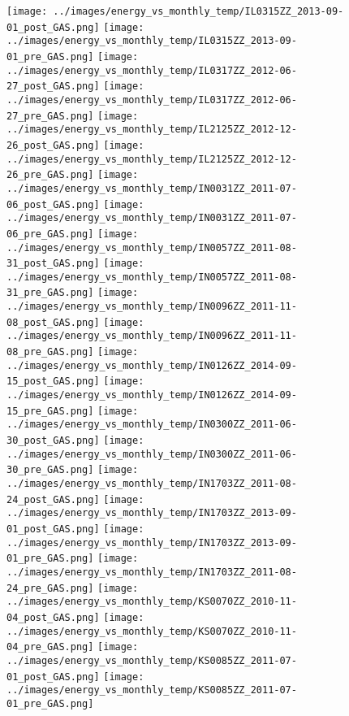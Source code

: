 \clearpage
\begin{figure}
\centering
\texttt{[image: ../images/energy\_vs\_monthly\_temp/IL0315ZZ\_2013-09-01\_post\_GAS.png]}
\texttt{[image: ../images/energy\_vs\_monthly\_temp/IL0315ZZ\_2013-09-01\_pre\_GAS.png]}
\texttt{[image: ../images/energy\_vs\_monthly\_temp/IL0317ZZ\_2012-06-27\_post\_GAS.png]}
\texttt{[image: ../images/energy\_vs\_monthly\_temp/IL0317ZZ\_2012-06-27\_pre\_GAS.png]}
\texttt{[image: ../images/energy\_vs\_monthly\_temp/IL2125ZZ\_2012-12-26\_post\_GAS.png]}
\texttt{[image: ../images/energy\_vs\_monthly\_temp/IL2125ZZ\_2012-12-26\_pre\_GAS.png]}
\texttt{[image: ../images/energy\_vs\_monthly\_temp/IN0031ZZ\_2011-07-06\_post\_GAS.png]}
\texttt{[image: ../images/energy\_vs\_monthly\_temp/IN0031ZZ\_2011-07-06\_pre\_GAS.png]}
\texttt{[image: ../images/energy\_vs\_monthly\_temp/IN0057ZZ\_2011-08-31\_post\_GAS.png]}
\texttt{[image: ../images/energy\_vs\_monthly\_temp/IN0057ZZ\_2011-08-31\_pre\_GAS.png]}
\texttt{[image: ../images/energy\_vs\_monthly\_temp/IN0096ZZ\_2011-11-08\_post\_GAS.png]}
\texttt{[image: ../images/energy\_vs\_monthly\_temp/IN0096ZZ\_2011-11-08\_pre\_GAS.png]}
\texttt{[image: ../images/energy\_vs\_monthly\_temp/IN0126ZZ\_2014-09-15\_post\_GAS.png]}
\texttt{[image: ../images/energy\_vs\_monthly\_temp/IN0126ZZ\_2014-09-15\_pre\_GAS.png]}
\texttt{[image: ../images/energy\_vs\_monthly\_temp/IN0300ZZ\_2011-06-30\_post\_GAS.png]}
\texttt{[image: ../images/energy\_vs\_monthly\_temp/IN0300ZZ\_2011-06-30\_pre\_GAS.png]}
\texttt{[image: ../images/energy\_vs\_monthly\_temp/IN1703ZZ\_2011-08-24\_post\_GAS.png]}
\texttt{[image: ../images/energy\_vs\_monthly\_temp/IN1703ZZ\_2013-09-01\_post\_GAS.png]}
\texttt{[image: ../images/energy\_vs\_monthly\_temp/IN1703ZZ\_2013-09-01\_pre\_GAS.png]}
\texttt{[image: ../images/energy\_vs\_monthly\_temp/IN1703ZZ\_2011-08-24\_pre\_GAS.png]}
\texttt{[image: ../images/energy\_vs\_monthly\_temp/KS0070ZZ\_2010-11-04\_post\_GAS.png]}
\texttt{[image: ../images/energy\_vs\_monthly\_temp/KS0070ZZ\_2010-11-04\_pre\_GAS.png]}
\texttt{[image: ../images/energy\_vs\_monthly\_temp/KS0085ZZ\_2011-07-01\_post\_GAS.png]}
\texttt{[image: ../images/energy\_vs\_monthly\_temp/KS0085ZZ\_2011-07-01\_pre\_GAS.png]}
\end{figure}
